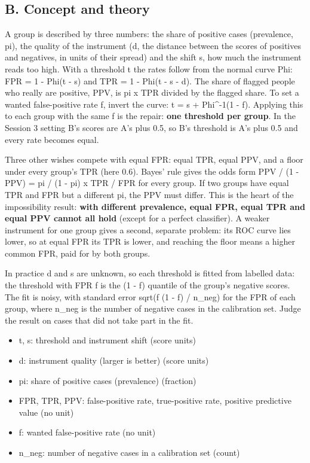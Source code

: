 \documentclass[11pt,a4paper]{article}
\begin{document}
\subsection*{B. Concept and theory}
A group is described by three numbers: the share of positive cases (prevalence, pi), the quality of the instrument (d, the distance between the scores of positives and negatives, in units of their spread) and the shift s, how much the instrument reads too high. With a threshold t the rates follow from the normal curve Phi: FPR = 1 - Phi(t - s) and TPR = 1 - Phi(t - s - d). The share of flagged people who really are positive, PPV, is pi x TPR divided by the flagged share. To set a wanted false-positive rate f, invert the curve: t = s + Phi\textasciicircum{}-1(1 - f). Applying this to each group with the same f is the repair: \textbf{one threshold per group}. In the Session 3 setting B's scores are A's plus 0.5, so B's threshold is A's plus 0.5 and every rate becomes equal.

Three other wishes compete with equal FPR: equal TPR, equal PPV, and a floor under every group's TPR (here 0.6). Bayes' rule gives the odds form PPV / (1 - PPV) = pi / (1 - pi) x TPR / FPR for every group. If two groups have equal TPR and FPR but a different pi, the PPV must differ. This is the heart of the impossibility result: \textbf{with different prevalence, equal FPR, equal TPR and equal PPV cannot all hold} (except for a perfect classifier). A weaker instrument for one group gives a second, separate problem: its ROC curve lies lower, so at equal FPR its TPR is lower, and reaching the floor means a higher common FPR, paid for by both groups.

In practice d and s are unknown, so each threshold is fitted from labelled data: the threshold with FPR f is the (1 - f) quantile of the group's negative scores. The fit is noisy, with standard error sqrt(f (1 - f) / n\_neg) for the FPR of each group, where n\_neg is the number of negative cases in the calibration set. Judge the result on cases that did not take part in the fit.

\begin{itemize}[nosep]
\item t, s: threshold and instrument shift (score units)
\item d: instrument quality (larger is better) (score units)
\item pi: share of positive cases (prevalence) (fraction)
\item FPR, TPR, PPV: false-positive rate, true-positive rate, positive predictive value (no unit)
\item f: wanted false-positive rate (no unit)
\item n\_neg: number of negative cases in a calibration set (count)
\end{itemize}
\end{document}
